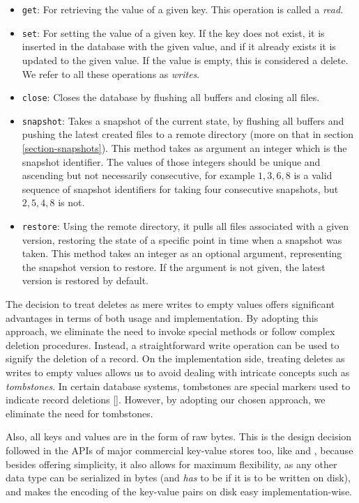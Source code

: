 \begin{itemize}
    \item \verb"get": For retrieving the value of a given key. This operation is called a \textit{read}.
    \item \verb"set": For setting the value of a given key. If the key does not exist, it is inserted in the database with the given value, and if it already exists it is updated to the given value. If the value is empty, this is considered a delete. We refer to all these operations as \textit{writes}.
    \item \verb"close": Closes the database by flushing all buffers and closing all files.
    \item \verb"snapshot": Takes a snapshot of the current state, by flushing all buffers and pushing the latest created files to a remote directory (more on that in section \ref{section-snapshots}). This method takes as argument an integer which is the snapshot identifier. The values of those integers should be unique and ascending but not necessarily consecutive, for example $1, 3, 6, 8$ is a valid sequence of snapshot identifiers for taking four consecutive snapshots, but $2, 5, 4, 8$ is not.

    \item \verb"restore": Using the remote directory, it pulls all files  associated with a given version, restoring the state of a specific point in time when a snapshot was taken. This method takes an integer as an optional argument, representing the snapshot version to restore. If the argument is not given, the latest version is restored by default.
\end{itemize}

The decision to treat deletes as mere writes to empty values offers significant advantages in terms of both usage and implementation. By adopting this approach, we eliminate the need to invoke special methods or follow complex deletion procedures. Instead, a straightforward write operation can be used to signify the deletion of a record. On the implementation side, treating deletes as writes to empty values allows us to avoid dealing with intricate concepts such as \textit{tombstones}. In certain database systems, tombstones are special markers used to indicate record deletions [\cite{myrocks}]. However, by adopting our chosen approach, we eliminate the need for tombstones.

Also, all keys and values are in the form of raw bytes. This is the design decision followed in the APIs of major commercial key-value stores too, like \cite{rocksdb} and \cite{redis}, because besides offering simplicity, it also allows for maximum flexibility, as any other data type can be serialized in bytes (and \textit{has} to be if it is to be written on disk), and makes the encoding of the key-value pairs on disk easy implementation-wise.

